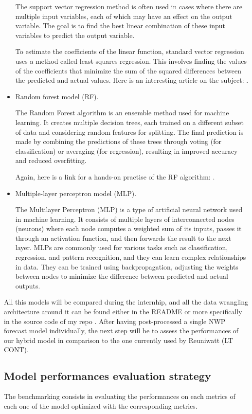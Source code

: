 \begin{itemize}
    The support vector regression method is often used in cases where there are multiple input variables, each of which may have an effect on the output variable. The goal is to find the best linear combination of these input variables to predict the output variable.

To estimate the coefficients of the linear function, standard vector regression uses a method called least squares regression. This involves finding the values of the coefficients that minimize the sum of the squared differences between the predicted and actual values.
    Here is an interesting article on the subject: \cite{SVR}.
    \item Random forest model (RF).

    The Random Forest algorithm is an ensemble method used for machine learning. It creates multiple decision trees, each trained on a different subset of data and considering random features for splitting. The final prediction is made by combining the predictions of these trees through voting (for classification) or averaging (for regression), resulting in improved accuracy and reduced overfitting.

Again, here is a link for a hands-on practise of the RF algorithm: \cite{RF}.
    \item Multiple-layer perceptron model (MLP).

The Multilayer Perceptron (MLP) is a type of artificial neural network used in machine learning. It consists of multiple layers of interconnected nodes (neurons) where each node computes a weighted sum of its inputs, passes it through an activation function, and then forwards the result to the next layer. MLPs are commonly used for various tasks such as classification, regression, and pattern recognition, and they can learn complex relationships in data. They can be trained using backpropagation, adjusting the weights between nodes to minimize the difference between predicted and actual outputs.

\end{itemize}
All this models will be compared during the internhip, and all the data wrangling architecture around it can be found either in the README or more specifically in the source code of my repo \cite{myrepo}.
After having post-processed a single NWP forecast model individually, the next step will be to assess the performances of our hybrid model in comparison to the one currently used by Reuniwatt (LT CONT).
\subsection{Model performances evaluation strategy}
The benchmarking consists in evaluating the performances on each metrics of each one of the model optimized with the corresponding metrics.

